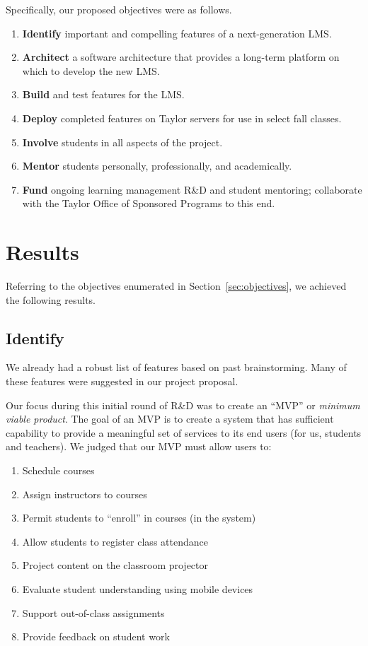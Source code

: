 \documentclass{article}
\begin{document}
Specifically, our proposed objectives
were as follows.
\begin{enumerate}
\item \textbf{Identify}
  important and compelling features of
  a next-generation LMS.
\item \textbf{Architect}
  a software architecture
  that provides a long-term platform
  on which to develop the new LMS.
\item \textbf{Build}
  and test features for the LMS.
\item \textbf{Deploy}
  completed features
  on Taylor servers
  for use in select fall classes.
\item \textbf{Involve}
  students in all aspects of the project.
\item \textbf{Mentor}
  students personally, professionally,
  and academically.
\item \textbf{Fund}
  ongoing learning management R\&D and student mentoring;
  collaborate with the Taylor Office of Sponsored Programs
  to this end.
\end{enumerate}

\section{Results}
\label{sec:results}

Referring to the objectives enumerated in Section~\ref{sec:objectives},
we achieved the following results.

\subsection{Identify}
\label{sec:identify}

We already had a robust list of features
based on past brainstorming.
Many of these features were suggested in our project proposal.

Our focus during this initial round of R\&D
was to create an ``MVP'' or \emph{minimum viable product}.
The goal of an MVP is to create a system
that has sufficient capability
to provide a meaningful set of services
to its end users (for us, students and teachers).
We judged that our MVP
must allow users to:
\begin{enumerate}
\item Schedule courses
\item Assign instructors to courses
\item Permit students to ``enroll'' in courses (in the system)
\item Allow students to register class attendance
\item Project content on the classroom projector
\item Evaluate student understanding using mobile devices
\item Support out-of-class assignments
\item Provide feedback on student work
\end{enumerate}
\end{document}
